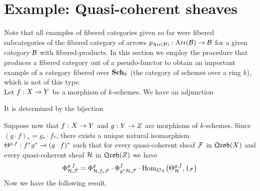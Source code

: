 \section{Example: Quasi-coherent sheaves}
\noindent
Note that all examples of fibered categories given so far were fibered subcategories of the fibered category of arrows $p_{\mathrm{Arr}({\mathcal B})}:\mathrm{Arr}({\mathcal B})\rightarrow {\mathcal B}$ for a given category ${\mathcal B}$ with fibered-products. In this section we employ the procedure that produces a fibered category out of a pseudo-functor to obtain an important example of a category fibered over $\mathbf{Sch}_k$ (the category of schemes over a ring $k$), which is not of this type.\\
Let $f:X\rightarrow Y$ be a morphism of $k$-schemes. We have an adjunction
\begin{center}   
\end{center}
It is determined by the bijection
\begin{center}
\end{center}
Suppose now that $f:X\rightarrow Y$ and $g:Y\rightarrow Z$ are morphisms of $k$-schemes. Since $(g\cdot f)_* = g_*\cdot f_*$, there exists a unique natural isomorphism $\Theta^{g,f}: f^*g^* \rightarrow (g\cdot f)^*$ such that for every quasi-coherent sheaf ${\mathcal F}$ in $\mathfrak{Qcoh}(X)$ and every quasi-coherent sheaf ${\mathcal H}$ in $\mathfrak{Qcoh}(Z)$ we have
$$\Phi^{g\cdot f}_{{\mathcal H},{\mathcal F}} = \Phi^g_{{\mathcal H},f_*{\mathcal F}}\cdot \Phi^f_{g^*{\mathcal H},{\mathcal F}}  \cdot \mathrm{Hom}_{{\mathcal O}_X}\big(\Theta^{g,f}_{{\mathcal H}},1_{{\mathcal F}}\big)$$
Now we have the following result.

